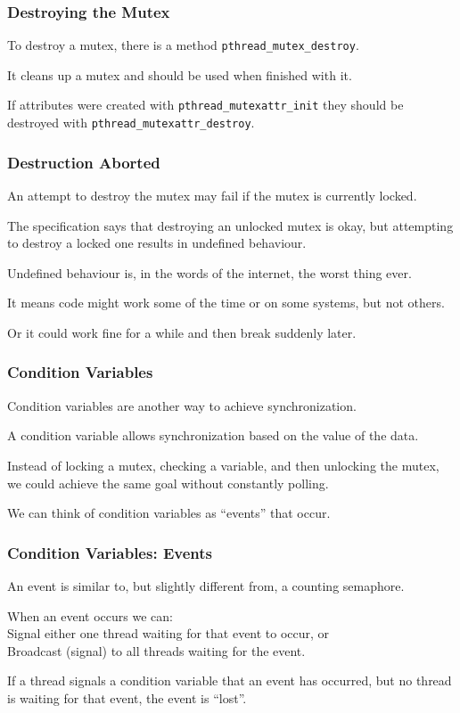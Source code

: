 \begin{frame}
\frametitle{Destroying the Mutex}

To destroy a mutex, there is a method \texttt{pthread\_mutex\_destroy}. 

It cleans up a mutex and should be used when finished with it.

If attributes were created with \texttt{pthread\_mutexattr\_init} they should be destroyed with \texttt{pthread\_mutexattr\_destroy}.

\end{frame}

\begin{frame}
\frametitle{Destruction Aborted}

An attempt to destroy the mutex may fail if the mutex is currently locked. 

The specification says that destroying an unlocked mutex is okay, but attempting to destroy a locked one results in undefined behaviour. 

Undefined behaviour is, in the words of the internet, the worst thing ever.

It means code might work some of the time or on some systems, but not others. 

Or it could work fine for a while and then break suddenly later.
\end{frame}

\begin{frame}
\frametitle{Condition Variables}

Condition variables are another way to achieve synchronization.

A condition variable allows synchronization based on the value of the data. 

Instead of locking a mutex, checking a variable, and then unlocking the mutex, we could achieve the same goal without constantly polling. 

We can think of condition variables as ``events'' that occur.

\end{frame}

\begin{frame}
\frametitle{Condition Variables: Events}

An event is similar to, but slightly different from, a counting semaphore. 

When an event occurs we can:\\
\quad Signal either one thread waiting for that event to occur, or\\
\quad Broadcast (signal) to all threads waiting for the event. 

If a thread signals a condition variable that an event has occurred, but no thread is waiting for that event, the event is ``lost''. 

\end{frame}

